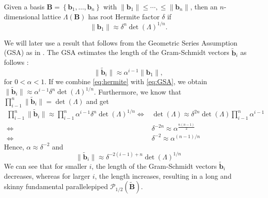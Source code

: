 \begin{definition}
  Given a basis $\mathbf{B} = \left\{\mathbf{b}_1, \ldots, \mathbf{b}_n\right\}$ with $\|\mathbf{b}_1\| \leq \cdots,  \leq \|\mathbf{b}_n\|$, then an $n$-dimensional lattice $\Lambda(\mathbf{B})$ has root Hermite factor $\delta$ if
  \begin{equation} \label{eq:hermite}
    \| \mathbf{b}_1 \| \approx \delta^n \det(\Lambda)^{1/n}.
  \end{equation}
\end{definition}%
We will later use a result that follows from the Geometric Series Assumption (GSA) as in \cite{Gop16}. The GSA estimates the length of the Gram-Schmidt vectors $\tilde{\mathbf{b}}_i$ as follows \cite{Sch03}: \label{sec:GSA} %
\begin{equation} \label{eq:GSA}
  \| \tilde{\mathbf{b}}_i \| \approx \alpha^{i-1} \| \mathbf{b}_1 \|,
\end{equation}
for $0 < \alpha < 1$. If we combine \cref{eq:hermite} with \cref{eq:GSA}, we obtain  $\| \tilde{\mathbf{b}}_i \| \approx \alpha^{i-1} \delta^n \det(\Lambda)^{1/n}$. Furthermore, we know that $\prod_{i-1}^n \| \tilde{\mathbf{b}}_i \| = \det(\Lambda)$  %
and get
\begin{align*}
  \prod_{i-1}^n \| \tilde{\mathbf{b}}_i \| \approx \prod_{i-1}^n \alpha^{i-1} \delta^n \det(\Lambda)^{1/n}
  \iff & \det(\Lambda) \approx \delta^{2n} \det(\Lambda) \prod_{i-1}^n \alpha^{i-1} \\
  \iff & \delta^{-2n} \approx \alpha^{\frac{n(n-1)}{2}}                             \\
  \iff & \delta^{-2} \approx \alpha^{(n-1)/n}
\end{align*}
Hence, $\alpha \approx \delta^{-2}$ and
\begin{equation}
  \| \tilde{\mathbf{b}}_i \| \approx \delta^{-2(i-1) + n} \det(\Lambda)^{1/n}
\end{equation}
We can see that for smaller $i$, the length of the Gram-Schmidt vectors $\tilde{\mathbf{b}}_i$ decreases, whereas for larger $i$, the length increases, resulting in a long and skinny fundamental parallelepiped $\mathcal{P}_{1/2}(\tilde{\mathbf{B}})$.




